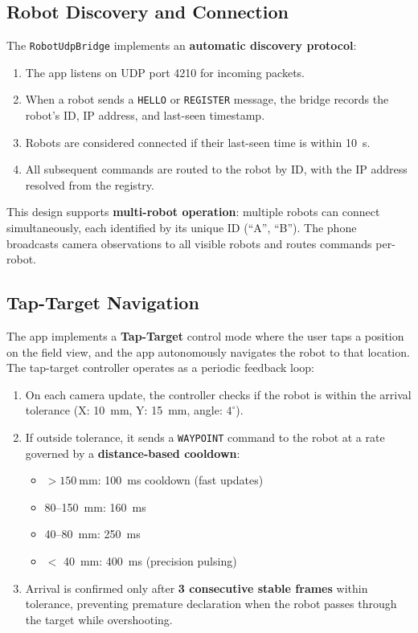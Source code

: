 \documentclass[12pt, a4paper, twoside]{article}
\begin{document}
\subsection{Robot Discovery and Connection}

The \texttt{RobotUdpBridge} implements an \textbf{automatic discovery protocol}:

\begin{enumerate}
    \item The app listens on UDP port 4210 for incoming packets.
    \item When a robot sends a \texttt{HELLO} or \texttt{REGISTER} message, the bridge records the robot's ID, IP address, and last-seen timestamp.
    \item Robots are considered connected if their last-seen time is within \SI{10}{\second}.
    \item All subsequent commands are routed to the robot by ID, with the IP address resolved from the registry.
\end{enumerate}

This design supports \textbf{multi-robot operation}: multiple robots can connect simultaneously, each identified by its unique ID (``A'', ``B''). The phone broadcasts camera observations to all visible robots and routes commands per-robot.

\subsection{Tap-Target Navigation}

The app implements a \textbf{Tap-Target} control mode where the user taps a position on the field view, and the app autonomously navigates the robot to that location. The tap-target controller operates as a periodic feedback loop:

\begin{enumerate}
    \item On each camera update, the controller checks if the robot is within the arrival tolerance (X: \SI{10}{\milli\metre}, Y: \SI{15}{\milli\metre}, angle: $4^\circ$).
    \item If outside tolerance, it sends a \texttt{WAYPOINT} command to the robot at a rate governed by a \textbf{distance-based cooldown}:
    \begin{itemize}
        \item $> \SI{150}{\milli\metre}$: \SI{100}{\milli\second} cooldown (fast updates)
        \item 80--\SI{150}{\milli\metre}: \SI{160}{\milli\second}
        \item 40--\SI{80}{\milli\metre}: \SI{250}{\milli\second}
        \item $<$ \SI{40}{\milli\metre}: \SI{400}{\milli\second} (precision pulsing)
    \end{itemize}
    \item Arrival is confirmed only after \textbf{3 consecutive stable frames} within tolerance, preventing premature declaration when the robot passes through the target while overshooting.
\end{enumerate}
\end{document}
